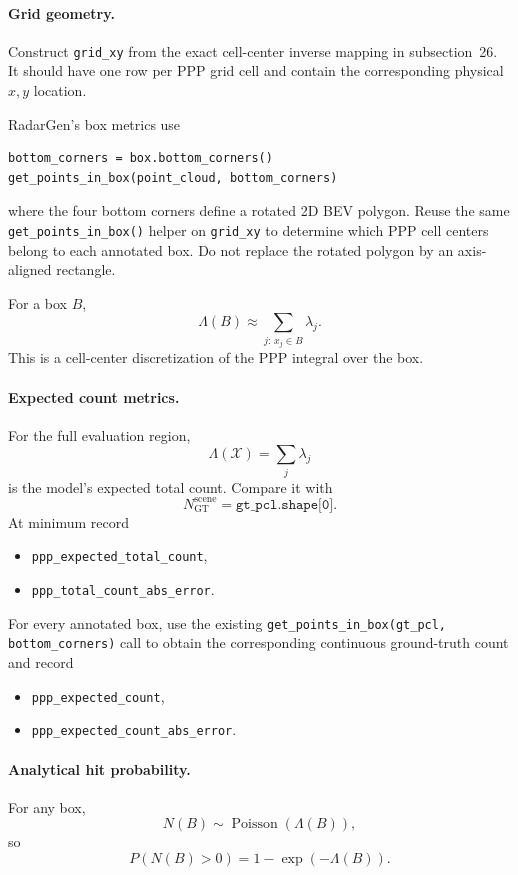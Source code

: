 \documentclass[11pt,a4paper]{article}
\begin{document}
\paragraph{Grid geometry.}
Construct \texttt{grid\_xy} from the exact cell-center inverse mapping in subsection~26. It should have one row per PPP grid cell and contain the corresponding physical \(x,y\) location.

RadarGen's box metrics use
\begin{lstlisting}
bottom_corners = box.bottom_corners()
get_points_in_box(point_cloud, bottom_corners)
\end{lstlisting}
where the four bottom corners define a rotated 2D BEV polygon. Reuse the same \texttt{get\_points\_in\_box()} helper on \texttt{grid\_xy} to determine which PPP cell centers belong to each annotated box. Do not replace the rotated polygon by an axis-aligned rectangle.

For a box \(B\),
\[
    \Lambda(B)
    \approx
    \sum_{j:\,x_j\in B}
    \lambda_j.
\]
This is a cell-center discretization of the PPP integral over the box.

\paragraph{Expected count metrics.}
For the full evaluation region,
\[
    \Lambda(\mathcal X)
    =
    \sum_j\lambda_j
\]
is the model's expected total count. Compare it with
\[
    N_{\mathrm{GT}}^{\mathrm{scene}}
    =
    \texttt{gt\_pcl.shape[0]}.
\]
At minimum record
\begin{itemize}
    \item \texttt{ppp\_expected\_total\_count},
    \item \texttt{ppp\_total\_count\_abs\_error}.
\end{itemize}

For every annotated box, use the existing \texttt{get\_points\_in\_box(gt\_pcl, bottom\_corners)} call to obtain the corresponding continuous ground-truth count and record
\begin{itemize}
    \item \texttt{ppp\_expected\_count},
    \item \texttt{ppp\_expected\_count\_abs\_error}.
\end{itemize}

\paragraph{Analytical hit probability.}
For any box,
\[
    N(B)
    \sim
    \operatorname{Poisson}(\Lambda(B)),
\]
so
\[
    P(N(B)>0)
    =
    1-\exp(-\Lambda(B)).
\]
\end{document}
